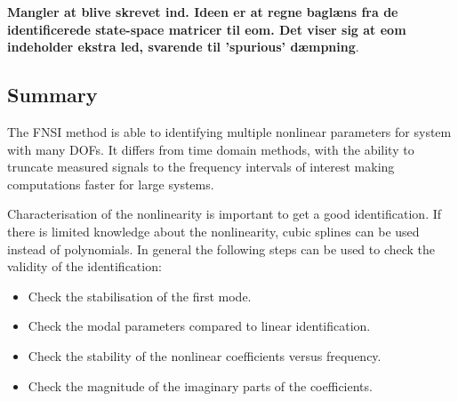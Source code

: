 \textbf{Mangler at blive skrevet ind. Ideen er at regne baglæns fra de
  identificerede state-space matricer til eom. Det viser sig at eom indeholder
  ekstra led, svarende til 'spurious' dæmpning}.


\subsection{Summary}
\label{sec:summary-fnsi}

The FNSI method is able to identifying multiple nonlinear parameters for system
with many DOFs. It differs from time domain methods, with the ability to
truncate measured signals to the frequency intervals of interest making
computations faster for large systems.

Characterisation of the nonlinearity is important to get a good identification.
If there is limited knowledge about the nonlinearity, cubic splines can be used
instead of polynomials.
In general the following steps can be used to check the validity of the
identification:

\begin{itemize}
\item Check the stabilisation of the first mode.
\item Check the modal parameters compared to linear identification.
\item Check the stability of the nonlinear coefficients versus frequency.
\item Check the magnitude of the imaginary parts of the coefficients.
\end{itemize}


